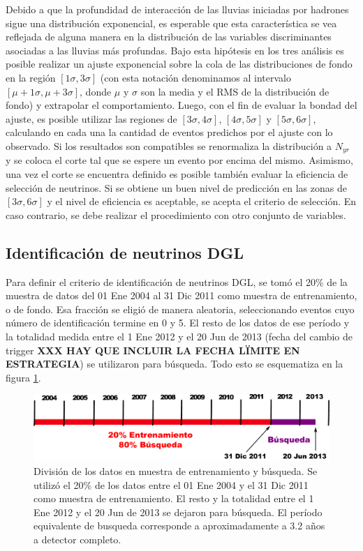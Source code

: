 	Debido a que la profundidad de interacción de las lluvias iniciadas por hadrones sigue una distribución exponencial, es esperable que esta característica se vea reflejada de alguna manera en la distribución de las variables discriminantes asociadas a las lluvias más profundas.
	Bajo esta hipótesis en los tres análisis es posible realizar un ajuste exponencial sobre la cola de las distribuciones de fondo en la región $[1\sigma, 3\sigma]$ (con esta notación denominamos al intervalo $[\mu+1\sigma, \mu+3\sigma]$, donde $\mu$ y $\sigma$ son la media y el RMS de la distribución de fondo) y extrapolar el comportamiento.
	Luego, con el fin de evaluar la bondad del ajuste, es posible utilizar las regiones de $[3\sigma, 4\sigma]$, $[4\sigma, 5\sigma]$ y $[5\sigma, 6\sigma]$, calculando en cada una la cantidad de eventos predichos por el ajuste con lo observado.
	Si los resultados son compatibles se renormaliza la distribución a $N_{yr}$ y se coloca el corte tal que se espere un evento por encima del mismo.
	Asimismo, una vez el corte se encuentra definido es posible también evaluar la eficiencia de selección de neutrinos.
	Si se obtiene un buen nivel de predicción en las zonas de $[3\sigma, 6\sigma]$ y el nivel de eficiencia es aceptable, se acepta el criterio de selección.
	En caso contrario, se debe realizar el procedimiento con otro conjunto de variables.
	
	\subsection{Identificación de neutrinos DGL}
	
	Para definir el criterio de identificación de neutrinos DGL, se tomó el 20$\%$ de la muestra de datos del 01 Ene 2004 al 31 Dic 2011 como muestra de entrenamiento, o de fondo.
	Esa fracción se eligió de manera aleatoria, seleccionando eventos cuyo número de identificación termine en 0 y 5.
	El resto de los datos de ese período y la totalidad medida entre el 1 Ene 2012 y el 20 Jun de 2013 (fecha del cambio de trigger \textbf{XXX HAY QUE INCLUIR LA FECHA LÏMITE EN ESTRATEGIA}) se utilizaron para búsqueda.
	Todo esto se esquematiza en la figura \ref{fig:periodosDGL}.
	\begin{figure}[ht]
	\begin{center}
	\includegraphics[width=\textwidth]{fig/seleccionAuger/periodosDGL}
	\caption{División de los datos en muestra de entrenamiento y búsqueda. Se utilizó el 20$\%$ de los datos entre el 01 Ene 2004 y el 31 Dic 2011 como muestra de entrenamiento. El resto y la totalidad entre el 1 Ene 2012 y el 20 Jun de 2013 se dejaron para búsqueda. El período equivalente de busqueda corresponde a aproximadamente a 3.2 años a detector completo.}
	\label{fig:periodosDGL}
	\end{center}
	\end{figure}
	

